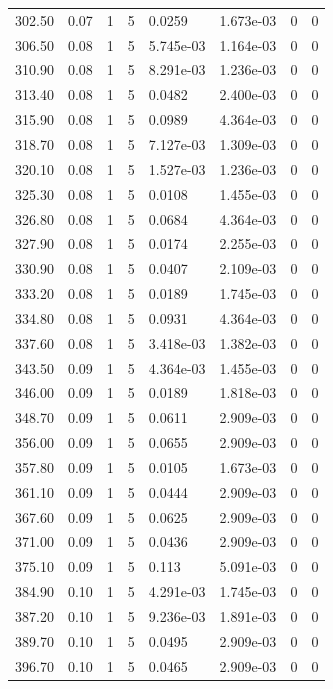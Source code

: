 \documentclass[preview]{standalone}
\begin{document}
{{{{\begin{tabular}{L{1.2cm}C{1.2cm} C{0.3cm}C{0.5cm} C{1.4cm}C{1.4cm} C{1.4cm}C{1.4cm}}
  302.50  &  0.07  & 1     &  5 &  0.0259  & 1.673e-03  & 0 &  0   \\ 
  306.50  &  0.08  & 1     &  5 &  5.745e-03  & 1.164e-03  & 0 &  0   \\ 
  310.90  &  0.08  & 1     &  5 &  8.291e-03  & 1.236e-03  & 0 &  0   \\ 
  313.40  &  0.08  & 1     &  5 &  0.0482  & 2.400e-03  & 0 &  0   \\ 
  315.90  &  0.08  & 1     &  5 &  0.0989  & 4.364e-03  & 0 &  0   \\ 
  318.70  &  0.08  & 1     &  5 &  7.127e-03  & 1.309e-03  & 0 &  0   \\ 
  320.10  &  0.08  & 1     &  5 &  1.527e-03  & 1.236e-03  & 0 &  0   \\ 
  325.30  &  0.08  & 1     &  5 &  0.0108  & 1.455e-03  & 0 &  0   \\ 
  326.80  &  0.08  & 1     &  5 &  0.0684  & 4.364e-03  & 0 &  0   \\ 
  327.90  &  0.08  & 1     &  5 &  0.0174  & 2.255e-03  & 0 &  0   \\ 
  330.90  &  0.08  & 1     &  5 &  0.0407  & 2.109e-03  & 0 &  0   \\ 
  333.20  &  0.08  & 1     &  5 &  0.0189  & 1.745e-03  & 0 &  0   \\ 
  334.80  &  0.08  & 1     &  5 &  0.0931  & 4.364e-03  & 0 &  0   \\ 
  337.60  &  0.08  & 1     &  5 &  3.418e-03  & 1.382e-03  & 0 &  0   \\ 
  343.50  &  0.09  & 1     &  5 &  4.364e-03  & 1.455e-03  & 0 &  0   \\ 
  346.00  &  0.09  & 1     &  5 &  0.0189  & 1.818e-03  & 0 &  0   \\ 
  348.70  &  0.09  & 1     &  5 &  0.0611  & 2.909e-03  & 0 &  0   \\ 
  356.00  &  0.09  & 1     &  5 &  0.0655  & 2.909e-03  & 0 &  0   \\ 
  357.80  &  0.09  & 1     &  5 &  0.0105  & 1.673e-03  & 0 &  0   \\ 
  361.10  &  0.09  & 1     &  5 &  0.0444  & 2.909e-03  & 0 &  0   \\ 
  367.60  &  0.09  & 1     &  5 &  0.0625  & 2.909e-03  & 0 &  0   \\ 
  371.00  &  0.09  & 1     &  5 &  0.0436  & 2.909e-03  & 0 &  0   \\ 
  375.10  &  0.09  & 1     &  5 &  0.113  & 5.091e-03  & 0 &  0   \\ 
  384.90  &  0.10  & 1     &  5 &  4.291e-03  & 1.745e-03  & 0 &  0   \\ 
  387.20  &  0.10  & 1     &  5 &  9.236e-03  & 1.891e-03  & 0 &  0   \\ 
  389.70  &  0.10  & 1     &  5 &  0.0495  & 2.909e-03  & 0 &  0   \\ 
  396.70  &  0.10  & 1     &  5 &  0.0465  & 2.909e-03  & 0 &  0   \\ 
\hline 
\end{tabular} 

}}}}
\end{document}
